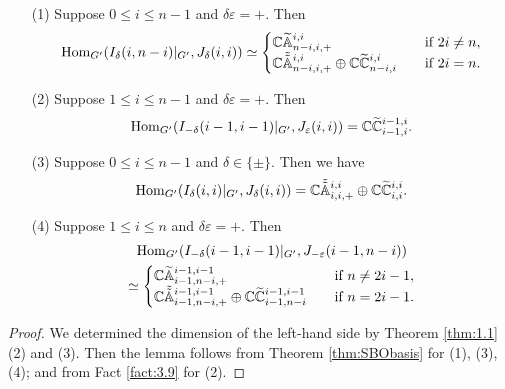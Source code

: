 \begin{lemma}
\label{lem:170529}
\begin{enumerate}
\item[{\rm{(1)}}]
Suppose $0 \le i \le n-1$
 and $\delta \varepsilon=+$.  
Then 
\begin{equation*}
{\operatorname{Hom}}_{G'}
     (I_{\delta}(i,n-i)|_{G'}, J_{\delta}(i,i))
\simeq
\begin{cases}
{\mathbb{C}}{\widetilde{\mathbb{A}}}_{{n-i},{i},{+}}^{{i,i}}
\quad
&\text{if $2i \ne n$},  
\\
{\mathbb{C}}\tilde{\tilde{{\mathbb{A}}}}_{{n-i},{i},{+}}^{{i,i}}
\oplus
{\mathbb{C}}\widetilde{{\mathbb{C}}}_{{n-i},{i}}^{{i,i}}
\quad
&\text{if $2i = n$}.  
\end{cases}
\end{equation*}
\item[{\rm{(2)}}]
Suppose $1 \le i \le n-1$
 and $\delta \varepsilon=+$.  
Then 
\begin{equation*}
{\operatorname{Hom}}_{G'}
     (I_{-\delta}(i-1,i-1)|_{G'}, J_{\varepsilon}(i,i))
=
{\mathbb{C}}\widetilde{{\mathbb{C}}}_{{i-1},{i}}^{{i-1,i}}.  
\end{equation*}
\item[{\rm{(3)}}]
Suppose $0 \le i \le n-1$
 and $\delta \in \{\pm\}$.  
Then we have
\begin{equation*}
{\operatorname{Hom}}_{G'}
     (I_{\delta}(i,i)|_{G'}, J_{\delta}(i,i))
=
{\mathbb{C}}\tilde{\tilde{{\mathbb{A}}}}_{{i},{i},{+}}^{{i,i}}
\oplus
{\mathbb{C}} \widetilde{{\mathbb{C}}}_{{i},{i}}^{{i,i}}.    
\end{equation*}
\item[{\rm{(4)}}]
Suppose $1 \le i \le n$
 and $\delta \varepsilon=+$.  
Then 
\begin{multline*}
{\operatorname{Hom}}_{G'}
     (I_{-\delta}(i-1,i-1)|_{G'}, J_{-\varepsilon}(i-1,n-i))
\\
\simeq
\begin{cases}
{\mathbb{C}}{\widetilde{\mathbb{A}}}_{{i-1},{n-i},{+}}^{{i-1,i-1}}
\quad
&\text{if $n \ne 2i-1$},  
\\
{\mathbb{C}}\tilde{\tilde{{\mathbb{A}}}}_{{i-1},{n-i},{+}}^{{i-1,i-1}}
\oplus
{\mathbb{C}} \widetilde{{\mathbb{C}}}_{{i-1},{n-i}}^{{i-1,i-1}}
\quad
&\text{if $n=2i-1$}.  
\end{cases}
\end{multline*}
\end{enumerate}
\end{lemma}
\begin{proof}
We determined the dimension of the left-hand side
 by Theorem \ref{thm:1.1} (2) and (3).  
Then the lemma follows from Theorem \ref{thm:SBObasis}
 for (1), (3), (4);
 and from Fact \ref{fact:3.9} for (2).  
\end{proof}

